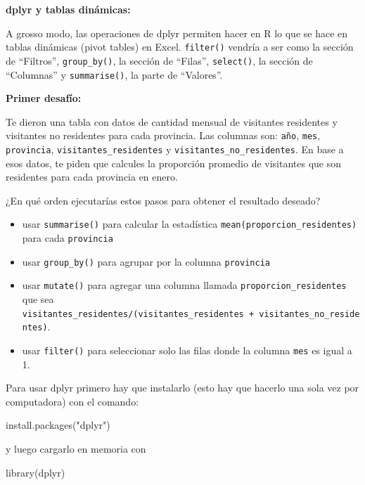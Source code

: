 \documentclass[
  openany]{book}
\newenvironment{Shaded}{\begin{snugshade}}{\end{snugshade}}
\newcommand{\FunctionTok}[1]{\textcolor[rgb]{0.00,0.00,0.00}{#1}}
\newcommand{\NormalTok}[1]{#1}
\newcommand{\StringTok}[1]{\textcolor[rgb]{0.31,0.60,0.02}{#1}}
\providecommand{\tightlist}{%
  \setlength{\itemsep}{0pt}\setlength{\parskip}{0pt}}
\begin{document}
\textbf{dplyr y tablas dinámicas:}

A grosso modo, las operaciones de dplyr permiten hacer en R lo que se hace en tablas dinámicas (pivot tables) en Excel.
\texttt{filter()} vendría a ser como la sección de ``Filtros'', \texttt{group\_by()}, la sección de ``Filas'', \texttt{select()}, la sección de ``Columnas'' y \texttt{summarise()}, la parte de ``Valores''.

\textbf{Primer desafío:}

Te dieron una tabla con datos de cantidad mensual de visitantes residentes y visitantes no residentes para cada provincia.
Las columnas son: \texttt{año}, \texttt{mes}, \texttt{provincia}, \texttt{visitantes\_residentes} y \texttt{visitantes\_no\_residentes}.
En base a esos datos, te piden que calcules la proporción promedio de visitantes que son residentes para cada provincia en enero.

¿En qué orden ejecutarías estos pasos para obtener el resultado deseado?

\begin{itemize}
\tightlist
\item
  usar \texttt{summarise()} para calcular la estadística \texttt{mean(proporcion\_residentes)} para cada \texttt{provincia}
\item
  usar \texttt{group\_by()} para agrupar por la columna \texttt{provincia}
\item
  usar \texttt{mutate()} para agregar una columna llamada \texttt{proporcion\_residentes} que sea \texttt{visitantes\_residentes/(visitantes\_residentes\ +\ visitantes\_no\_residentes)}.
\item
  usar \texttt{filter()} para seleccionar solo las filas donde la columna \texttt{mes} es igual a 1.
\end{itemize}

Para usar dplyr primero hay que instalarlo (esto hay que hacerlo una sola vez por computadora) con el comando:

\begin{Shaded}
\begin{Highlighting}[]
\FunctionTok{install.packages}\NormalTok{(}\StringTok{"dplyr"}\NormalTok{)}
\end{Highlighting}
\end{Shaded}

y luego cargarlo en memoria con

\begin{Shaded}
\begin{Highlighting}[]
\FunctionTok{library}\NormalTok{(dplyr)}
\end{Highlighting}
\end{Shaded}
\end{document}
